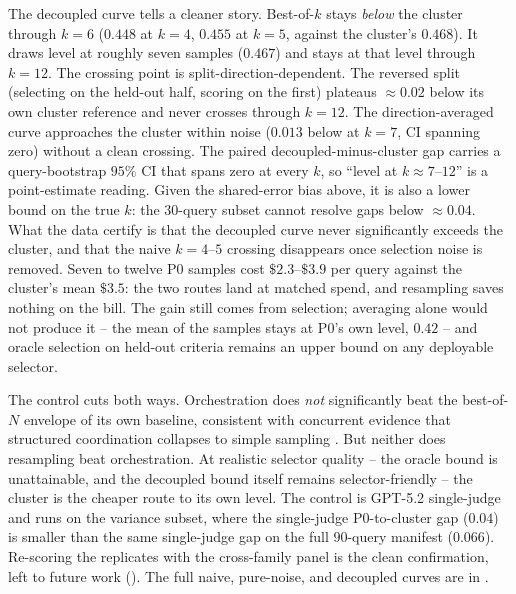 \documentclass[11pt]{article}
\begin{document}
The decoupled curve tells a cleaner story. Best-of-$k$ stays \emph{below}
the cluster through $k{=}6$ ($0.448$ at $k{=}4$, $0.455$ at $k{=}5$, against the
cluster's $0.468$). It draws level at roughly seven samples ($0.467$) and stays at that
level through $k{=}12$. The crossing point is split-direction-dependent. The reversed
split (selecting on the held-out half, scoring on the first) plateaus $\approx\!0.02$
below its own cluster reference and never crosses through $k{=}12$. The
direction-averaged curve approaches the cluster within noise ($0.013$ below at $k{=}7$,
CI spanning zero) without a clean crossing. The paired decoupled-minus-cluster gap
carries a query-bootstrap $95\%$ CI that spans zero at every $k$, so ``level at
$k{\approx}7$--$12$'' is a point-estimate reading. Given the shared-error bias above, it
is also a lower bound on the true $k$: the $30$-query subset cannot resolve gaps below
$\approx\!0.04$. What the data certify is that the decoupled curve never significantly
exceeds the cluster, and that the naive $k{=}4$--$5$ crossing disappears once selection
noise is removed. Seven to twelve P0 samples cost $\$2.3$--$\$3.9$ per query against the
cluster's mean $\$3.5$: the two routes land at matched spend, and resampling saves
nothing on the bill. The gain still comes from selection; averaging alone would not produce it -- the mean of the samples stays at P0's
own level, $0.42$ -- and oracle selection on held-out criteria remains an upper bound on
any deployable selector.

The control cuts both ways. Orchestration does \emph{not} significantly beat the best-of-$N$ envelope of its
own baseline, consistent with concurrent evidence that structured coordination collapses
to simple sampling \citep{choi2025debatevote}. But neither does resampling beat
orchestration. At realistic selector quality -- the oracle bound is unattainable, and
the decoupled bound itself remains selector-friendly -- the cluster is the cheaper route
to its own level. The control is GPT-5.2 single-judge and runs on the variance subset,
where the single-judge P0-to-cluster gap ($0.04$) is smaller than the same single-judge
gap on the full $90$-query manifest ($0.066$). Re-scoring the replicates with the
cross-family panel is the clean confirmation, left to future work
(). The full naive, pure-noise, and decoupled curves are in
.
\end{document}

